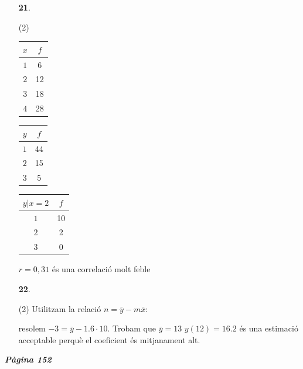 \documentclass[a4paper, pdf, twoside]{book}
\begin{document}
\begin{multicols}{2}
\begin{enumerate}

 \item[\fontfamily{phv}\selectfont\color{blue}\textbf{21}. ] 
 \begin{tasks}[column-sep=1em, item-indent=1.3333em](2)
	 \task* \begin {tabular}{|c|c|}\hline \rowcolor {lightgray} $x$ & $f$ \\\hline $1$ & 6\\ \hline $2$ & 12\\ \hline $3$ & 18\\ \hline $4$ & 28\\ \hline \end {tabular} \hspace {0.25cm} \begin {tabular}{|c|c|}\hline \rowcolor {lightgray} $y$ & $f$ \\\hline $1$ & 44\\ \hline $2$ & 15\\ \hline $3$ & 5\\ \hline \end {tabular}
	 \task* \begin {tabular}{|c|c|}\hline \rowcolor {lightgray} $y | x=2$ & $f$ \\\hline $1$ & 10\\ \hline $2$ & 2\\ \hline $3$ & 0\\ \hline \end {tabular}
	 \task* $r=0,31$ és una correlació molt feble\par {} 
\end{tasks}
\vspace{0.25cm}



 \item[\fontfamily{phv}\selectfont\color{blue}\textbf{22}. ] 
 \begin{tasks}[column-sep=1em, item-indent=1.3333em](2)
	 \task* Utilitzam la relació $n=\bar y - m \bar x$:\par resolem $-3=\bar y -1.6 \cdot 10$. Trobam que $\bar y =13$
	 \task* $y(12)=16.2$ és una estimació acceptable perquè el coeficient és mitjanament alt.
\end{tasks}
 \end{enumerate}
\vspace{0.3cm}


{\textbf{\em Pàgina 152}} \hrulefill
\begin{enumerate}
\vspace{0.25cm}



\end{enumerate}
\end{multicols}
\end{document}

